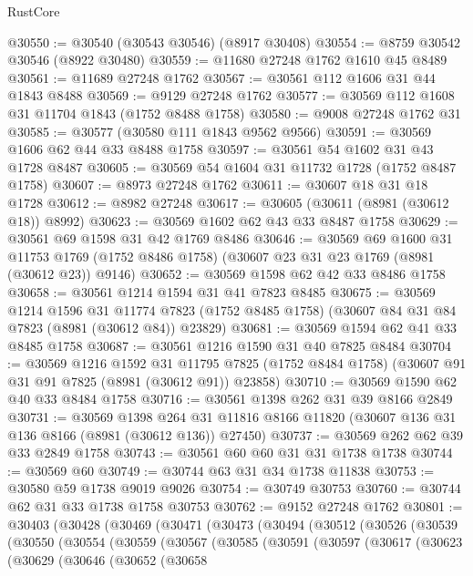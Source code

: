 \begin{lexlean}{RustCore}
\begin{coremodule}
@30550 := @30540 (@30543 @30546) (@8917 @30408)
@30554 := @8759 @30542 @30546 (@8922 @30480)
@30559 := @11680 @27248 @1762 @1610 @45 @8489
@30561 := @11689 @27248 @1762
@30567 := @30561 @112 @1606 @31 @44 @1843 @8488
@30569 := @9129 @27248 @1762
@30577 := @30569 @112 @1608 @31 @11704 @1843 (@1752 @8488 @1758)
@30580 := @9008 @27248 @1762 @31
@30585 := @30577 (@30580 @111 @1843 @9562 @9566)
@30591 := @30569 @1606 @62 @44 @33 @8488 @1758
@30597 := @30561 @54 @1602 @31 @43 @1728 @8487
@30605 := @30569 @54 @1604 @31 @11732 @1728 (@1752 @8487 @1758)
@30607 := @8973 @27248 @1762
@30611 := @30607 @18 @31 @18 @1728
@30612 := @8982 @27248
@30617 := @30605 (@30611 (@8981 (@30612 @18)) @8992)
@30623 := @30569 @1602 @62 @43 @33 @8487 @1758
@30629 := @30561 @69 @1598 @31 @42 @1769 @8486
@30646 := @30569
    @69
    @1600
    @31
    @11753
    @1769
    (@1752 @8486 @1758)
    (@30607 @23 @31 @23 @1769 (@8981 (@30612 @23)) @9146)
@30652 := @30569 @1598 @62 @42 @33 @8486 @1758
@30658 := @30561 @1214 @1594 @31 @41 @7823 @8485
@30675 := @30569
    @1214
    @1596
    @31
    @11774
    @7823
    (@1752 @8485 @1758)
    (@30607 @84 @31 @84 @7823 (@8981 (@30612 @84)) @23829)
@30681 := @30569 @1594 @62 @41 @33 @8485 @1758
@30687 := @30561 @1216 @1590 @31 @40 @7825 @8484
@30704 := @30569
    @1216
    @1592
    @31
    @11795
    @7825
    (@1752 @8484 @1758)
    (@30607 @91 @31 @91 @7825 (@8981 (@30612 @91)) @23858)
@30710 := @30569 @1590 @62 @40 @33 @8484 @1758
@30716 := @30561 @1398 @262 @31 @39 @8166 @2849
@30731 := @30569
    @1398
    @264
    @31
    @11816
    @8166
    @11820
    (@30607 @136 @31 @136 @8166 (@8981 (@30612 @136)) @27450)
@30737 := @30569 @262 @62 @39 @33 @2849 @1758
@30743 := @30561 @60 @60 @31 @31 @1738 @1738
@30744 := @30569 @60
@30749 := @30744 @63 @31 @34 @1738 @11838
@30753 := @30580 @59 @1738 @9019 @9026
@30754 := @30749 @30753
@30760 := @30744 @62 @31 @33 @1738 @1758 @30753
@30762 := @9152 @27248 @1762
@30801 := @30403
    (@30428
      (@30469
        (@30471
          (@30473
            (@30494
              (@30512
                (@30526
                  (@30539
                    (@30550
                      (@30554
                        (@30559
                          (@30567
                            (@30585
                              (@30591
                                (@30597
                                  (@30617
                                    (@30623
                                      (@30629
                                        (@30646
                                          (@30652
                                            (@30658

\end{coremodule}
\end{lexlean}
